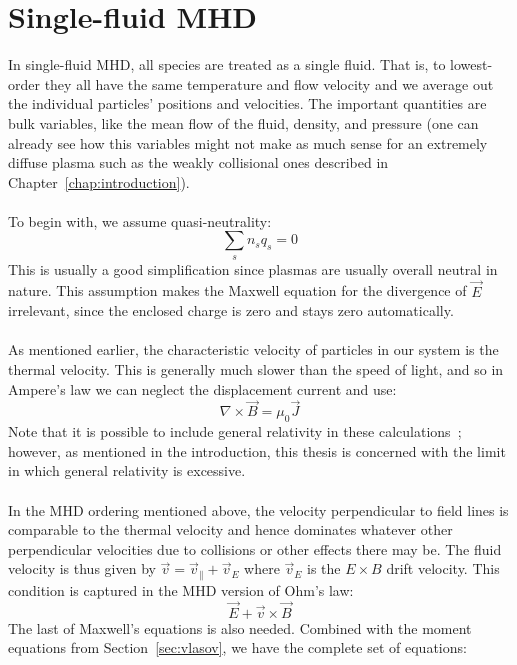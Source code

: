 \section{Single-fluid MHD} \label{sec:idealMHD}
In single-fluid MHD, all species are treated as a single fluid. That is, to lowest-order they all have the same temperature and flow velocity and we average out the individual particles' positions and velocities. The important quantities are bulk variables, like the mean flow of the fluid, density, and pressure (one can already see how this variables might not make as much sense for an extremely diffuse plasma such as the weakly collisional ones described in Chapter~\ref{chap:introduction}).\\
\\
To begin with, we assume quasi-neutrality:
\begin{equation}
  \sum_s n_sq_s=0 \label{eq:quasineutrality}
\end{equation}
This is usually a good simplification since plasmas are usually overall neutral in nature. This assumption makes the Maxwell equation for the divergence of $\vec E$ irrelevant, since the enclosed charge is zero and stays zero automatically. \\
\\
As mentioned earlier, the characteristic velocity of particles in our system is the thermal velocity. This is generally much slower than the speed of light, and so in Ampere's law we can neglect the displacement current and use:
\begin{equation}
  \nabla\times \vec B=\mu_0 \vec J
\end{equation}
Note that it is possible to include general relativity in these calculations~\cite{XXXXGammieHARM,XX}; however, as mentioned in the introduction, this thesis is concerned with the limit in which general relativity is excessive.\\
\\
In the MHD ordering mentioned above, the velocity perpendicular to field lines is comparable to the thermal velocity and hence dominates whatever other perpendicular velocities due to collisions or other effects there may be. The fluid velocity is thus given by $\vec v=\vec v_{\parallel}+\vec v_{E}$ where $\vec v_E$ is the $E\times B$ drift velocity. This condition is captured in the MHD version of Ohm's law:
\begin{equation}
  \vec E+\vec v\times\vec B
\end{equation}
The last of Maxwell's equations is also needed. Combined with the moment equations from Section~\ref{sec:vlasov}, we have the complete set of equations:
